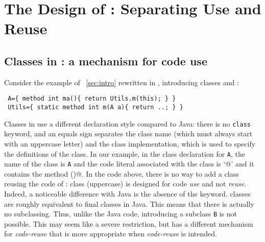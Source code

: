 
\section{The Design of \name: Separating Use and Reuse}\label{sec:separate}
%


\subsection{Classes in \name: a mechanism for code use}

Consider the example of%
~\autoref{sec:intro}
rewritten in \name, introducing classes \Q@Utils@ and \Q@A@:

\begin{lstlisting}
 A={ method int ma(){ return Utils.m(this); } }
 Utils={ static method int m(A a){ return ..; } }
\end{lstlisting} 

\noindent Classes in \name use a different declaration style compared
to Java: there is no \lstinline{class} keyword, and an equals sign separates the class name (which must always start with
an uppercase letter) and the class implementation, which is used to specify the
definitions of the class. In our example, in the class declaration
for \lstinline{A}, the name of the class is \lstinline{A} and the code 
literal associated with the class is `@' and it contains the method \Q@ma()@.
In the \name code above, there is no way to add a class 
\Q@B@ reusing the code of \Q@A@: class \Q@A@ (uppercase) is designed for code \emph{use} and not \emph{reuse}.
Indeed, a noticeable difference with Java is the
absence of the \Q@extends@ keyword.
\name classes are roughly equivalent to final classes in Java. This means that there is actually no subclassing.
Thus, unlike the Java code, introducing a subclass
\lstinline{B} is not possible. This may seem like a severe restriction, but
\name has a different mechanism for \emph{code-reuse} that 
is more appropriate when \emph{code-reuse} is intended. 


